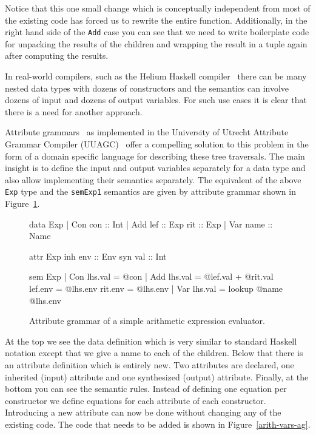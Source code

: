 \documentclass[11pt]{article}
\begin{document}
Notice that this one small change which is conceptually independent from most of the existing code has forced us to rewrite the entire function. Additionally, in the right hand side of the \texttt{Add} case you can see that we need to write boilerplate code for unpacking the results of the children and wrapping the result in a tuple again after computing the results.

In real-world compilers, such as the Helium Haskell compiler~\cite{helium} there can be many nested data types with dozens of constructors and the semantics can involve dozens of input and dozens of output variables. For such use cases it is clear that there is a need for another approach.

Attribute grammars~\cite{knuth-attribute-grammars} as implemented in the University of Utrecht Attribute Grammar Compiler (UUAGC)~\cite{uuagc} offer a compelling solution to this problem in the form of a domain specific language for describing these tree traversals. The main insight is to define the input and output variables separately for a data type and also allow implementing their semantics separately. The equivalent of the above \texttt{Exp} type and the \texttt{semExp1} semantics are given by attribute grammar shown in Figure~\ref{arith-ag}.

\begin{figure}[h]
\begin{agcode}
data Exp
  | Con  con  :: Int
  | Add  lef  :: Exp   rit :: Exp
  | Var  name :: Name

attr Exp
  inh env :: Env
  syn val :: Int

sem Exp 
  | Con lhs.val = @con
  | Add lhs.val = @lef.val + @rit.val
        lef.env = @lhs.env
        rit.env = @lhs.env
  | Var lhs.val = lookup @name @lhs.env
\end{agcode}
  \caption{Attribute grammar of a simple arithmetic expression evaluator.}
  \label{arith-ag}
\end{figure}

At the top we see the data definition which is very similar to standard Haskell notation except that we give a name to each of the children. Below that there is an attribute definition which is entirely new. Two attributes are declared, one inherited (input) attribute and one synthesized (output) attribute. Finally, at the bottom you can see the semantic rules. Instead of defining one equation per constructor we define equations for each attribute of each constructor. Introducing a new attribute can now be done without changing any of the existing code. The code that needs to be added is shown in Figure~\ref{arith-vars-ag}.
\end{document}

